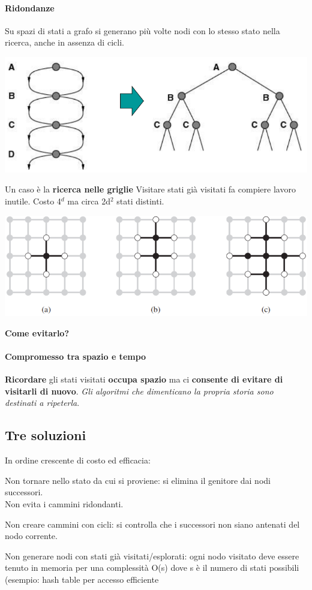 \documentclass[10pt]{book}
\begin{document}
\paragraph{Ridondanze}
Su spazi di stati a grafo si generano più volte nodi con lo stesso stato nella ricerca, anche in assenza di cicli.
\begin{center}
	\includegraphics[scale=0.7]{ridondanze.png}
\end{center}
\pagebreak
Un caso è la \textbf{ricerca nelle griglie} Visitare stati già visitati fa compiere lavoro inutile. Costo 4$^d$ ma circa 2d$^2$ stati distinti.
\begin{center}
	\includegraphics[scale=0.7]{griglie.png}
\end{center}
\textbf{Come evitarlo?}
\paragraph{Compromesso tra spazio e tempo} \textbf{Ricordare} gli stati visitati \textbf{occupa spazio} ma ci \textbf{consente di evitare di visitarli di nuovo}. \textit{Gli algoritmi che dimenticano la propria storia sono destinati a ripeterla}.
\subsection{Tre soluzioni} In ordine crescente di costo ed efficacia:
\begin{list}{}{}
	\item Non tornare nello stato da cui si proviene: si elimina il genitore dai nodi successori.\\
	Non evita i cammini ridondanti.
	\item Non creare cammini con cicli: si controlla che i successori non siano antenati del nodo corrente.
	\item Non generare nodi con stati già visitati/esplorati: ogni nodo visitato deve essere tenuto in memoria per una complessità O(s) dove s è il numero di stati possibili (esempio: hash table per accesso efficiente
\end{list}
\end{document}
